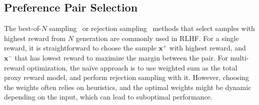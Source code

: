 \subsection{Preference Pair Selection}
\label{sec:frs}
The best-of-$N$ sampling~\citep{nakano2021webgpt, cobbe2021training} or rejection sampling~\citep{touvron2023llama} methods that 
select samples with highest reward from $N$ generation
are commonly used in RLHF.
For a single reward, it is straightforward to choose the sample $\mathbf{x}^+$ with highest reward, and $\mathbf{x}^-$ that has lowest reward to maximize the margin between the pair.
For multi-reward optimization, the na\"ive approach is to use weighted sum as the total proxy reward model, and perform rejection sampling with it. 
However, choosing the weights often relies on heuristics, and the optimal weights might be dynamic depending on the input, which can lead to suboptimal performance.



